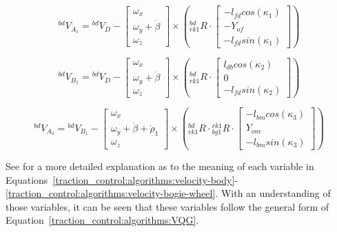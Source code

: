 \begin{equation}\label{traction_control:algorithms:velocity-rocker-wheel}
	{}^{bd}V_{A_{1}} = {}^{bd}V_{D} - \left[\begin{array}{c}
		\omega_{x} \\
		\omega_{y} + \dot{\beta} \\
		\omega_{z}
	\end{array}\right] \times \left({}^{bd}_{rk1}R \cdot \left[\begin{array}{c}
		-l_{fd} cos(\kappa_{1}) \\
		-Y_{of} \\
		-l_{fd} sin(\kappa_{1})
	\end{array}\right]\right)
\end{equation}

\begin{equation}\label{traction_control:algorithms:velocity-bogie}
	{}^{bd}V_{B_{1}} = {}^{bd}V_{D} - \left[\begin{array}{c}
		\omega_{x} \\
		\omega_{y} + \dot{\beta} \\
		\omega_{z}
	\end{array}\right] \times \left({}^{bd}_{rk1}R \cdot \left[\begin{array}{c}
		l_{db} cos(\kappa_{2}) \\
		0 \\
		-l_{fd} sin(\kappa_{2})
	\end{array}\right]\right)
\end{equation}

\begin{equation}\label{traction_control:algorithms:velocity-bogie-wheel}
	{}^{bd}V_{A_{3}} = {}^{bd}V_{B_{1}} - \left[\begin{array}{c}
		\omega_{x} \\
		\omega_{y} + \dot{\beta} + \dot{\rho}_{1} \\
		\omega_{z}
	\end{array}\right] \times \left({}^{bd}_{rk1}R \cdot {}^{rk1}_{bg1}R \cdot \left[\begin{array}{c}
		-l_{bm} cos(\kappa_{3}) \\
		Y_{om} \\
		-l_{bm} sin(\kappa_{3})
	\end{array}\right]\right)
\end{equation}

See \cite{tractl} for a more detailed explanation as to the meaning of each variable in Equations~\ref{traction_control:algorithms:velocity-body}-\ref{traction_control:algorithms:velocity-bogie-wheel}. With an understanding of those variables, it can be seen that these variables follow the general form of Equation~\ref{traction_control:algorithms:VQG}. \\

